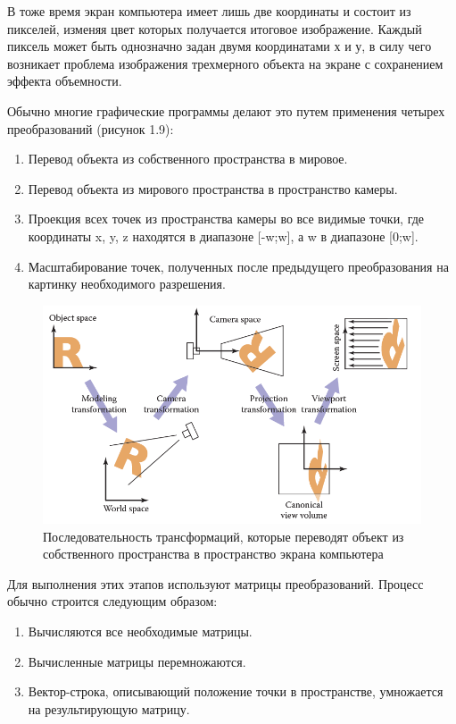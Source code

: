 \documentclass[12pt,a4paper,oneside]{report}
\begin{document}
	 В тоже время экран компьютера имеет лишь две координаты и состоит из пикселей, изменяя цвет которых получается итоговое изображение. Каждый пиксель может быть однозначно задан двумя координатами х и у, в силу чего возникает проблема изображения трехмерного объекта на экране с сохранением эффекта объемности.
	
	Обычно многие графические программы делают это путем применения четырех преобразований (рисунок 1.9):
	\begin{enumerate}
		\item Перевод объекта из собственного пространства в мировое.
		\item Перевод объекта из мирового пространства в пространство камеры.
		\item Проекция всех точек из пространства камеры во все видимые точки, где координаты x, y, z находятся в диапазоне [-w;w], а w в диапазоне [0;w].
		\item Масштабирование точек, полученных после предыдущего преобразования на картинку необходимого разрешения.
	\end{enumerate}

	\begin{figure}[H]
		\centering
		\includegraphics[scale=0.7]{spaces}
		\caption{Последовательность трансформаций, которые переводят объект из собственного пространства в пространство экрана компьютера}
	\end{figure}

	 Для выполнения этих этапов используют матрицы преобразований. Процесс обычно строится следующим образом:
	\begin{enumerate}
		\item Вычисляются все необходимые матрицы.
		\item Вычисленные матрицы перемножаются.
		\item Вектор-строка, описывающий положение точки в пространстве, умножается на результирующую матрицу.
	\end{enumerate}		
	
\end{document}
